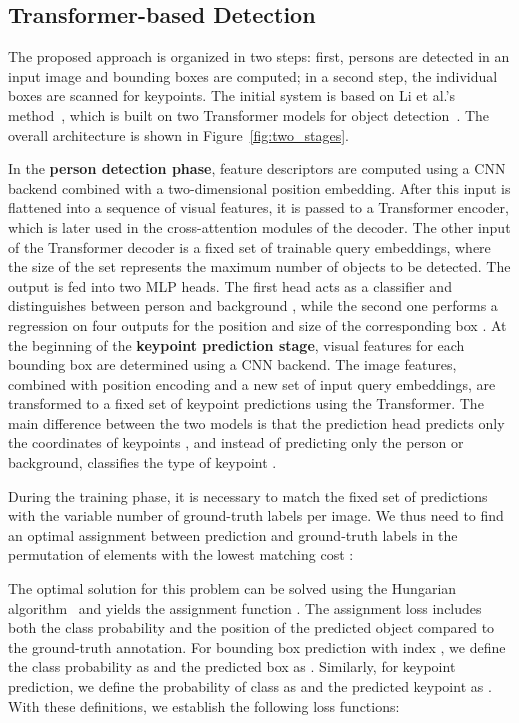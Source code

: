 \documentclass[sigconf]{acmart}
\begin{document}
\subsection{Transformer-based Detection}\label{sec:detection}

The proposed approach is organized in two steps: 
first, persons are detected in an input image and bounding boxes are computed; in a second step, the individual boxes are scanned for keypoints. 
The initial system is based on Li et al.'s method~\cite{DBLP:conf/cvpr/0012WZXXT21}, which is built on two Transformer models for object detection~\cite{DBLP:conf/nips/VaswaniSPUJGKP17, DBLP:conf/eccv/CarionMSUKZ20}. 
The overall architecture is shown in Figure~\ref{fig:two_stages}.

In the \textbf{person detection phase}, feature descriptors are computed using a \ac{CNN} backend combined with a two-dimensional position embedding. 
After this input is flattened into a sequence of visual features, it is passed to a Transformer encoder, which is later used in the cross-attention modules of the decoder. 
The other input of the Transformer decoder is a fixed set of trainable query embeddings, where the size of the set represents the maximum number of objects to be detected. 
The output is fed into two \ac{MLP} heads. 
The first head acts as a classifier and distinguishes between person  and background , while the second one performs a regression on four outputs for the position and size of the corresponding box . 
At the beginning of the \textbf{keypoint prediction stage}, visual features for each bounding box are determined using a \ac{CNN} backend. 
The image features, combined with position encoding and a new set of input query embeddings, are transformed to a fixed set of keypoint predictions using the Transformer. 
The main difference between the two models is that the prediction head predicts only the coordinates of keypoints , and instead of predicting only the person or background, classifies the type of keypoint .

During the training phase, it is necessary to match the fixed set of predictions with the variable number of ground-truth labels per image. We thus need to find an optimal assignment  between prediction  and ground-truth labels  in the permutation of  elements  with the lowest matching cost :

The optimal solution for this problem can be solved using the Hungarian algorithm~\cite{kuhn1955hungarian} and yields the assignment function . The assignment loss includes both the class probability and the position of the predicted object compared to the ground-truth annotation. For bounding box prediction with index , we define the class probability  as  and the predicted box as . Similarly, for keypoint prediction, we define the probability of class  as  and the predicted keypoint as .
With these definitions, we establish the following loss functions:
\end{document}
